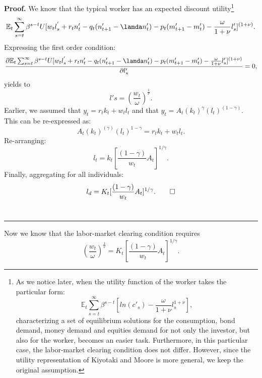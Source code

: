 \documentclass[12pt]{article}%
\newenvironment{proof}[1][Proof]{\noindent\textbf{#1.} }{\ \rule{0.5em}{0.5em}}
\begin{document}
\begin{proof}
We know that the typical worker has an expected discount utility\footnote{
As we notice later, when the utility function of the worker takes the particular
form:
\begin{equation}
\mathbb{E}_t \sum_{s=t}^{\infty} \beta^{s-t} [ln(c'_s) -
\frac{\omega}{1+\nu}l_s^{1+\nu}],
\end{equation}
characterizing a set of equilibrium solutions for the consumption, bond demand,
money demand and equities demand for not only the investor, but also for the
worker, becomes an easier task. Furthermore, in this particular case, the
labor-market clearing condition does not differ. However, since the utility
representation of Kiyotaki and Moore is more general, we keep the original assumption.
}
\begin{equation}
\mathbb{E}_t \sum_{s=t}^{\infty} \beta^{s-t} U[w_t l_s^{'}+r_t n'_t -q_t(n'_{t+1}-\lamda n'_t)-p_t (m'_{t+1}-m'_{t})
-\frac{\omega}{1+\nu}l'_{s}]^{(1+\nu)}.
\end{equation}
Expressing the first order condition:
\begin{equation}
\frac{ \partial \mathbb{E}_t \sum_{s=t}^{\infty} \beta^{s-t} U[w_t l_s^{'}+r_t n'_t -q_t(n'_{t+1}-\lamda n'_t)-p_t (m'_{t+1}-m'_{t})
-\frac{\omega}{1+\nu}l'_{s}]^{(1+\nu)}}{\partial l'_{s}} = 0,
\end{equation}
yields to
\begin{equation}
 l's = (\frac{w_t}{\omega})^{\frac{1}{\nu}}.
\end{equation}
Earlier, we assumed that $y_t = r_t k_t + w_t l_t$ and that $y_t = A_t (k_t)^{\gamma}
(l_t)^{(1-\gamma)}$. This can be re-expressed as:
\begin{equation}
A_t (k_t)^(\gamma) (l_t)^{1 -\gamma} = r_t k_t + w_t l_t.
\end{equation}
Re-arranging:
\begin{equation}
l_t = k_t [\frac{(1-\gamma)}{w_t}A_t]^{1/\gamma}.
\end{equation}
Finally, aggregating for all individuals:
\begin{equation}
l_d =  K_t [\frac{(1-\gamma)}{w_t}A_t]^{1/\gamma}. \qed
\end{equation}
\end{proof}
Now we know that the labor-market clearing condition requires
\begin{equation}
(\frac{w_t}{\omega})^{\frac{1}{\nu}}=  K_t [\frac{(1-\gamma)}{w_t}A_t]^{1/\gamma}.
\end{equation}
 
\end{document}
